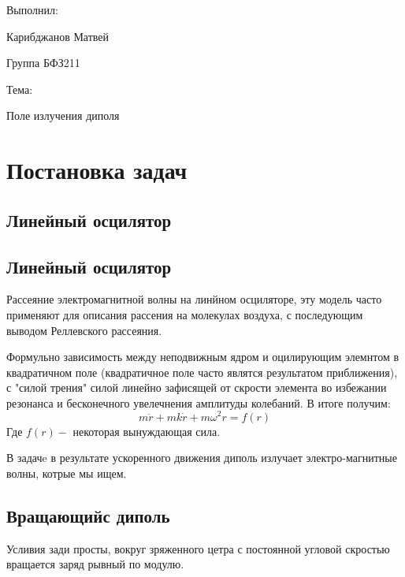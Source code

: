 \documentclass[a4paper]{article}
\numberwithin{equation}{section}
\begin{document}
\begin{flushright}
    Выполнил:

    Карибджанов Матвей
    
    Группа БФЗ211

    Тема:

    Поле излучения диполя
\end{flushright}
\tableofcontents
{}
\pagestyle{main}
\pagecolor{mycolor}



\section{Постановка задач}
\subsection{Линейный осцилятор}
\subsection{Линейный осцилятор}
Рассеяние электромагнитной волны на линйном осциляторе, эту модель 
часто применяют для описания рассения на молекулах воздуха, с последующим 
выводом Реллевского рассеяния. 

Формульно зависимость между неподвижным ядром и оцилирующим элемнтом 
в квадратичном поле (квадратичное поле часто являтся результатом приближения), 
с "силой трения" силой линейно зафисящей от скрости элемента во избежании 
резонанса и бесконечного увелечнения амплитуды колебаний. В итоге получим:
\begin{equation}
    m\ddot r + mk \dot r + m\omega^2 r = f(r)
\end{equation}
Где $f(r)-$ некоторая вынуждающая сила.

В задачe в результате ускоренного движения диполь излучает 
электро-магнитные волны, котрые мы ищем.
\subsection{Вращающийс диполь}
Усливия зади просты, вокруг зряженного цетра с постоянной угловой скростью вращается заряд 
рывный по модулю.







\end{document}

